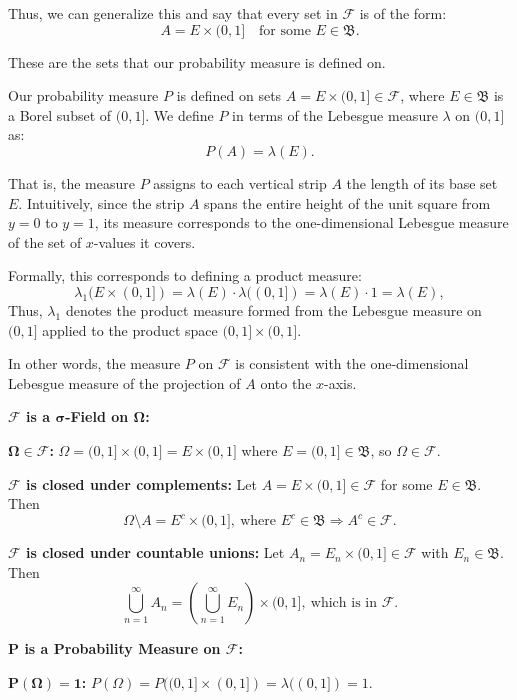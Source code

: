 \begin{proofline}
\begin{minipage}[t]{0.59\textwidth}
    Thus, we can generalize this and say that every set in $\mathcal{F}$ is of the form:
    \[
    A = E \times (0,1] \quad \text{for some } E \in \mathfrak{B}.
    \]

    These are the sets that our probability measure is defined on.\\
\end{minipage}

Our probability measure $P$ is defined on sets $A = E \times (0,1] \in \mathcal{F}$, where $E \in \mathfrak{B}$ is a Borel subset of $(0,1]$. We define $P$ in terms of the Lebesgue measure $\lambda$ on $(0,1]$ as:
\[
P(A) = \lambda(E).
\]

That is, the measure $P$ assigns to each vertical strip $A$ the length of its base set $E$. Intuitively, since the strip $A$ spans the entire height of the unit square from $y = 0$ to $y = 1$, its measure corresponds to the one-dimensional Lebesgue measure of the set of $x$-values it covers.

Formally, this corresponds to defining a product measure:
\[
\lambda_1(E \times (0,1]) = \lambda(E) \cdot \lambda((0,1]) = \lambda(E) \cdot 1 = \lambda(E),
\]
Thus, $\lambda_1$ denotes the product measure formed from the Lebesgue measure on $(0,1]$ applied to the product space $(0,1] \times (0,1]$.

In other words, the measure $P$ on $\mathcal{F}$ is consistent with the one-dimensional Lebesgue measure of the projection of $A$ onto the $x$-axis.

\textbf{$\boldsymbol{\mathcal{F}}$ is a $\boldsymbol{\sigma}$-Field on $\boldsymbol{\Omega}$:}
\vspace{-1ex}
\begin{proofline}
    \textbf{$\boldsymbol{\Omega \in \mathcal{F}}$:} 
    $\Omega = (0,1] \times (0,1] = E \times (0,1]$ where $E = (0,1] \in \mathfrak{B}$, so $\Omega \in \mathcal{F}$.
    
    \textbf{$\boldsymbol{\mathcal{F}}$ is closed under complements:} 
    Let $A = E \times (0,1] \in \mathcal{F}$ for some $E \in \mathfrak{B}$. 
    Then
    \vspace{-1ex}
    \[
        \Omega \setminus A = E^c \times (0,1],\ \text{where } E^c \in \mathfrak{B} \Rightarrow A^c \in \mathcal{F}.
    \]
    
    \textbf{$\boldsymbol{\mathcal{F}}$ is closed under countable unions:} 
    Let $A_n = E_n \times (0,1] \in \mathcal{F}$ with $E_n \in \mathfrak{B}$. 
    Then
    \vspace{-3ex}
    \[
        \bigcup_{n=1}^{\infty} A_n = \left( \bigcup_{n=1}^{\infty} E_n \right) \times (0,1],\ \text{which is in } \mathcal{F}.
    \]
  \end{proofline}
  \vspace{1ex}
  \textbf{$\boldsymbol{P}$ is a Probability Measure on $\boldsymbol{\mathcal{F}}$:}
  \vspace{-1ex}
  \begin{proofline}
    \textbf{$\boldsymbol{P(\Omega) = 1}$:}  \quad $P(\Omega) = P((0,1] \times (0,1]) = \lambda((0,1]) = 1.$
    

\end{proofline}
\end{proofline}
